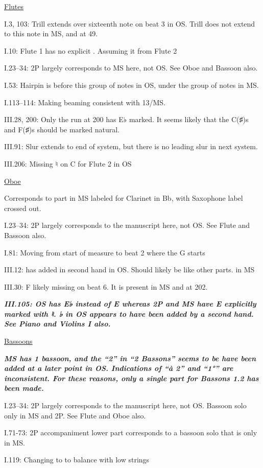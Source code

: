 \documentclass[twoside]{article}
\newcommand\dynmark[1]{\scalebox{0.9}{#1}{\kern1pt}}
\begin{document}
\begin{hangparas}{15pt}{1}
\begin{multicols}{2}
\underline{Flutes}

I.3, 103: Trill extends over sixteenth note on beat 3 in OS. Trill does not extend to this note in MS, and at 49.

I.10: Flute 1 has no explicit \dynmark{\mf}. Assuming it from Flute 2

I.23--34: 2P largely corresponds to MS here, not OS. See Oboe and Bassoon also.

I.53: Hairpin is before this group of notes in OS, under the group of notes in MS.

I.113--114: Making beaming consistent with 13/MS.

III.28, 200: Only the run at 200 has E♭ marked. It seems likely that the C(♯)s and F(♯)s should be marked natural.

III.91: Slur extends to end of system, but there is no leading slur in next system.

III.206: Missing ♮ on C for Flute 2 in OS

\underline{Oboe}

Corresponds to part in MS labeled for Clarinet in Bb, with Saxophone label crossed out.

I.23--34: 2P largely corresponds to the manuscript here, not OS. See Flute and Bassoon also.

I.81: Moving \dynmark{\mf} from start of measure to beat 2 where the G starts

III.12: \dynmark{\f} has added in second hand in OS. Should likely be \dynmark{\ff} like other parts. \dynmark{\ff} in MS

III.30: F likely missing on beat 6. It is present in MS and at 202.

\textbf{\textit{III.105: OS has E♭ instead of E whereas 2P and MS have E explicitly marked with ♮. ♭ in OS appears to have been added by a second hand. See Piano and Violins I also.}}

\underline{Bassoons}

\textbf{\textit{MS has 1 bassoon, and the ``2'' in ``2 Bassons'' seems to be have been added at a later point in OS. Indications of ``à 2'' and ``1°'' are inconsistent. For these reasons, only a single part for Bassons 1.2 has been made. }}

I.23--34: 2P largely corresponds to the manuscript here, not OS. Bassoon solo only in MS and 2P. See Flute and Oboe also.

I.71-73: 2P accompaniment lower part corresponds to a bassoon solo that is only in MS.

I.119: Changing \dynmark{\f} to \dynmark{\ff} to balance with low strings


\end{multicols}
\end{hangparas}
\end{document}
